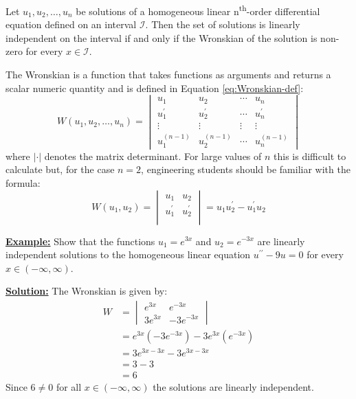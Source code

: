 \begin{theorem}
Let $u_1,u_2,\dots,u_n$ be solutions of a homogeneous linear n\textsuperscript{th}-order differential equation defined on an interval $\mathcal{I}$.  Then the set of solutions is linearly independent on the interval if and only if the Wronskian of the solution is non-zero for every $x \in \mathcal{I}$.  
\end{theorem}
The Wronskian is a function that takes functions as arguments and returns a scalar numeric quantity and is defined in Equation \ref{eq:Wronskian-def}:\begin{equation}
W(u_1,u_2,\dots,u_n)=
\begin{vmatrix}
u_1 & u_2 & \cdots & u_n \\
u^{\prime}_1 & u^{\prime}_2 & \cdots & u^{\prime}_n \\
\vdots & \vdots & \vdots & \vdots \\
u^{(n-1)}_1 & u^{(n-1)}_2 & \cdots & u^{(n-1)}_n
\end{vmatrix}
\label{eq:Wronskian-def}
\end{equation}
where $|\cdot|$ denotes the matrix determinant.  For large values of $n$ this is difficult to calculate but, for the case $n=2$, engineering students should be familiar with the formula:
\begin{equation}
W(u_1,u_2) = 
\begin{vmatrix}
u_1 & u_2 \\
u^{\prime}_1 & u^{\prime}_2 \\
\end{vmatrix}
= u_1 u^{\prime}_2 - u^{\prime}_1 u_2
\end{equation}

\vspace{0.5cm}

\noindent\textbf{\underline{Example:}} Show that the functions $u_1 = e^{3x}$ and $u_2=e^{-3x}$ are linearly independent solutions to the homogeneous linear equation $u^{\prime \prime}-9u=0$ for every $x \in (-\infty,\infty)$.

\vspace{0.0cm}

\noindent\textbf{\underline{Solution:}} The Wronskian is given by:
\begin{align*}
W &= 
\begin{vmatrix}
e^{3x} & e^{-3x} \\
3e^{3x} & -3e^{-3x}
\end{vmatrix} \\
&= e^{3x}\left(-3e^{-3x}\right) - 3e^{3x}\left(e^{-3x}\right) \\
&= 3e^{3x-3x} - 3e^{3x-3x} \\
&= 3 - 3 \\
&= 6
\end{align*}
\noindent Since $6 \ne 0$ for all $x \in (-\infty,\infty)$ the solutions are linearly independent.

